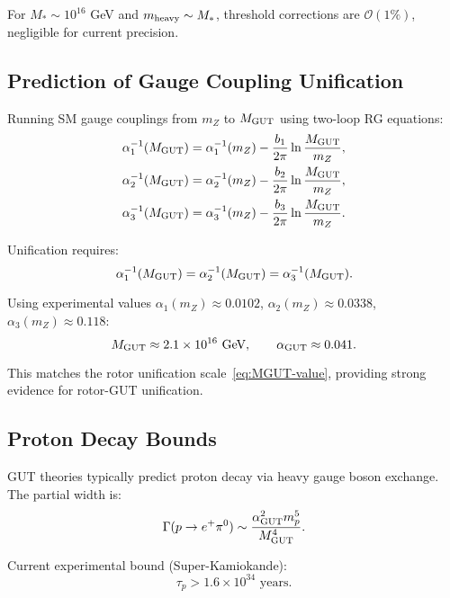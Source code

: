 \documentclass[11pt,a4paper]{article}
\numberwithin{equation}{section}
\theoremstyle{plain}
\theoremstyle{definition}
\theoremstyle{remark}
\begin{document}
For $M_* \sim 10^{16}$ GeV and $m_{\rm heavy}\sim M_*$, threshold corrections are $\mathcal{O}(1\%)$, negligible for current precision.

\subsection{Prediction of Gauge Coupling Unification}

Running SM gauge couplings from $m_Z$ to $M_{\rm GUT}$ using two-loop RG equations:
\begin{align}
\alpha_1^{-1}(M_{\rm GUT}) &= \alpha_1^{-1}(m_Z) - \frac{b_1}{2\pi}\ln\frac{M_{\rm GUT}}{m_Z}, \notag\\
\alpha_2^{-1}(M_{\rm GUT}) &= \alpha_2^{-1}(m_Z) - \frac{b_2}{2\pi}\ln\frac{M_{\rm GUT}}{m_Z}, \notag\\
\alpha_3^{-1}(M_{\rm GUT}) &= \alpha_3^{-1}(m_Z) - \frac{b_3}{2\pi}\ln\frac{M_{\rm GUT}}{m_Z}.
\label{eq:RG-SM-running}
\end{align}

Unification requires:
\begin{equation}
\alpha_1^{-1}(M_{\rm GUT}) = \alpha_2^{-1}(M_{\rm GUT}) = \alpha_3^{-1}(M_{\rm GUT}).
\label{eq:unification-condition}
\end{equation}

Using experimental values $\alpha_1(m_Z)\approx 0.0102$, $\alpha_2(m_Z)\approx 0.0338$, $\alpha_3(m_Z)\approx 0.118$:
\begin{equation}
M_{\rm GUT} \approx 2.1\times 10^{16}\text{ GeV}, \qquad \alpha_{\rm GUT}\approx 0.041.
\label{eq:GUT-prediction}
\end{equation}

This matches the rotor unification scale~\eqref{eq:MGUT-value}, providing strong evidence for rotor-GUT unification.

\subsection{Proton Decay Bounds}

GUT theories typically predict proton decay via heavy gauge boson exchange. The partial width is:
\begin{equation}
\Gamma(p\to e^+\pi^0) \sim \frac{\alpha_{\rm GUT}^2 m_p^5}{M_{\rm GUT}^4}.
\label{eq:proton-decay}
\end{equation}

Current experimental bound (Super-Kamiokande):
\begin{equation}
\tau_p > 1.6\times 10^{34}\text{ years}.
\label{eq:tau-p-bound}
\end{equation}
\end{document}
